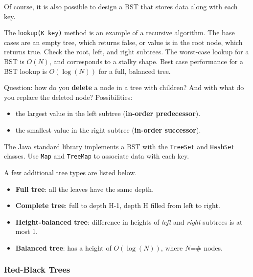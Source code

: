 Of course, it is also possible to design a BST that stores data along with each key. 

The l\texttt{ookup(K key)} method is an example of a recursive algorithm. The base cases are an empty tree, which returns false, or value is in the root node, which returns true. Check the root, left, and right subtrees. The worst-case lookup for a BST is $O(N)$, and corresponds to a stalky shape. Best case performance for a BST lookup is $O(\log(N))$ for a full, balanced tree. 

Question: how do you \textbf{delete} a node in a tree with children? And with what do you replace the deleted node? Possibilities:
\begin{itemize}
	\item the largest value in the left subtree (\textbf{in-order predecessor}). 
	\item the smallest value in the right subtree (\textbf{in-order successor}). 
\end{itemize}

The Java standard library implements a BST with the \texttt{TreeSet} and \texttt{HashSet} classes. Use \texttt{Map} and \texttt{TreeMap} to associate data with each key. 

A few additional tree types are listed below.

\begin{itemize} 
	\item \textbf{Full tree}: all the leaves have the same depth. 
	\item \textbf{Complete tree}: full to depth H-1, depth H filled from left to right. 
	\item \textbf{Height-balanced tree}: difference in heights of \textit{left} and \textit{right} subtrees is at most 1. 
	\item \textbf{Balanced tree}: has a height of $O(\log(N))$, where $N$=\# nodes.
\end{itemize}

\subsubsection{Red-Black Trees}

